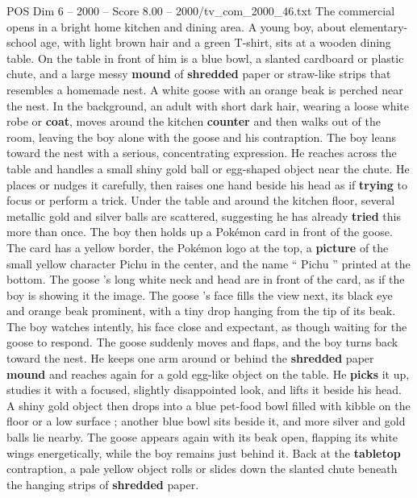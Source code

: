 \begin{textsample}{POS Dim 6 – 2000 – Score 8.00 – 2000/tv\_com\_2000\_46.txt}  \label{ex:f6_pos_055}
The commercial opens in a bright home kitchen and dining area.
A young boy, about elementary-school age, with light brown hair and a green T-shirt, sits at a wooden dining table.
On the table in front of him is a blue bowl, a slanted cardboard or plastic chute, and a large messy \textbf{mound} of \textbf{shredded} paper or straw-like strips that resembles a homemade nest.
A white goose with an orange beak is perched near the nest.
In the background, an adult with short dark hair, wearing a loose white robe or \textbf{coat}, moves around the kitchen \textbf{counter} and then walks out of the room, leaving the boy alone with the goose and his contraption.
The boy leans toward the nest with a serious, concentrating expression.
He reaches across the table and handles a small shiny gold ball or egg-shaped object near the chute.
He places or nudges it carefully, then raises one hand beside his head as if \textbf{trying} to focus or perform a trick.
Under the table and around the kitchen floor, several metallic gold and silver balls are scattered, suggesting he has already \textbf{tried} this more than once.
The boy then holds up a Pokémon card in front of the goose.
The card has a yellow border, the Pokémon logo at the top, a \textbf{picture} of the small yellow character Pichu in the center, and the name “ Pichu ” printed at the bottom.
The goose ’s long white neck and head are in front of the card, as if the boy is showing it the image.
The goose ’s face fills the view next, its black eye and orange beak prominent, with a tiny drop hanging from the tip of its beak.
The boy watches intently, his face close and expectant, as though waiting for the goose to respond.
The goose suddenly moves and flaps, and the boy turns back toward the nest.
He keeps one arm around or behind the \textbf{shredded} paper \textbf{mound} and reaches again for a gold egg-like object on the table.
He \textbf{picks} it up, studies it with a focused, slightly disappointed look, and lifts it beside his head.
A shiny gold object then drops into a blue pet-food bowl filled with kibble on the floor or a low surface ; another blue bowl sits beside it, and more silver and gold balls lie nearby.
The goose appears again with its beak open, flapping its white wings energetically, while the boy remains just behind it.
Back at the \textbf{tabletop} contraption, a pale yellow object rolls or slides down the slanted chute beneath the hanging strips of \textbf{shredded} paper.

\end{textsample}
